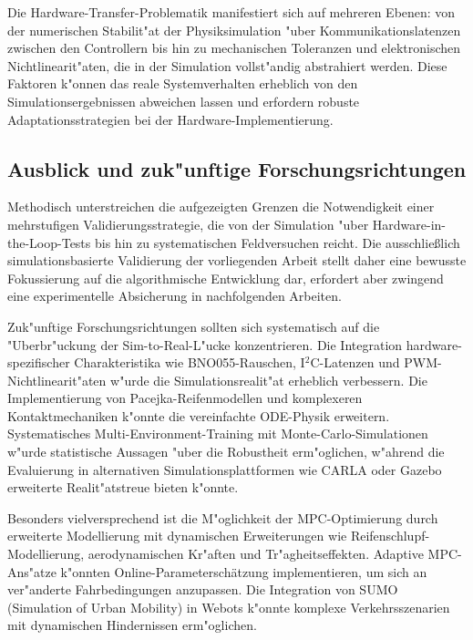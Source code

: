 Die Hardware-Transfer-Problematik manifestiert sich auf mehreren Ebenen: von der numerischen Stabilit{"a}t der Physiksimulation 
{"u}ber Kommunikationslatenzen zwischen den Controllern bis hin zu mechanischen Toleranzen und elektronischen Nichtlinearit{"a}ten, 
die in der Simulation vollst{"a}ndig abstrahiert werden. Diese Faktoren k{"o}nnen das reale Systemverhalten erheblich von den 
Simulationsergebnissen abweichen lassen und erfordern robuste Adaptationsstrategien bei der Hardware-Implementierung.

\subsection{Ausblick und zuk{"u}nftige Forschungsrichtungen}

Methodisch unterstreichen die aufgezeigten Grenzen die Notwendigkeit einer mehrstufigen Validierungsstrategie, die von der 
Simulation {"u}ber Hardware-in-the-Loop-Tests bis hin zu systematischen Feldversuchen reicht. Die ausschlie{\ss}lich 
simulationsbasierte Validierung der vorliegenden Arbeit stellt daher eine bewusste Fokussierung auf die algorithmische 
Entwicklung dar, erfordert aber zwingend eine experimentelle Absicherung in nachfolgenden Arbeiten.

Zuk{"u}nftige Forschungsrichtungen sollten sich systematisch auf die {"U}berbr{"u}ckung der Sim-to-Real-L{"u}cke konzentrieren. Die 
Integration hardware-spezifischer Charakteristika wie BNO055-Rauschen, I$^2$C-Latenzen und PWM-Nichtlinearit{"a}ten w{"u}rde die 
Simulationsrealit{"a}t erheblich verbessern. Die Implementierung von Pacejka-Reifenmodellen und komplexeren Kontaktmechaniken 
k{"o}nnte die vereinfachte ODE-Physik erweitern. Systematisches Multi-Environment-Training mit Monte-Carlo-Simulationen w{"u}rde 
statistische Aussagen {"u}ber die Robustheit erm{"o}glichen, w{"a}hrend die Evaluierung in alternativen Simulationsplattformen wie 
CARLA oder Gazebo erweiterte Realit{"a}tstreue bieten k{"o}nnte.

Besonders vielversprechend ist die M{"o}glichkeit der MPC-Optimierung durch erweiterte Modellierung mit dynamischen Erweiterungen 
wie Reifenschlupf-Modellierung, aerodynamischen Kr{"a}ften und Tr{"a}gheitseffekten. Adaptive MPC-Ans{"a}tze k{"o}nnten Online-Parametersch{\"a}tzung 
implementieren, um sich an ver{"a}nderte Fahrbedingungen anzupassen. Die Integration von SUMO (Simulation of Urban Mobility) in Webots 
k{"o}nnte komplexe Verkehrsszenarien mit dynamischen Hindernissen erm{"o}glichen.

